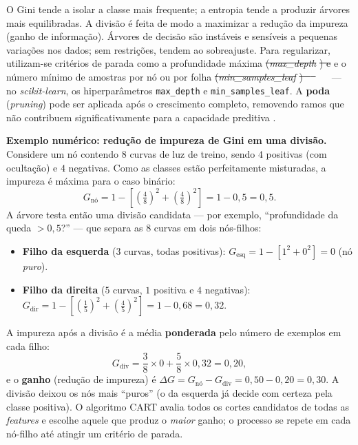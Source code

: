 \documentclass[msc]{on} %
\makeatletter
\providecommand{\DIFaddtex}[1]{{\protect\color{red}#1}} %
\providecommand{\DIFdeltex}[1]{{\protect\color{red}\sout{#1}}} %
\providecommand{\DIFaddbegin}{} %
\providecommand{\DIFaddend}{} %
\providecommand{\DIFdelbegin}{} %
\providecommand{\DIFdelend}{} %
\providecommand{\DIFadd}[1]{\texorpdfstring{\DIFaddtex{#1}}{#1}} %
\providecommand{\DIFdel}[1]{\texorpdfstring{\DIFdeltex{#1}}{}} %
\let\sout@orig\sout %
\renewcommand{\sout}[1]{\ifmmode\text{\sout@orig{\ensuremath{#1}}}\else\sout@orig{#1}\fi} %
\makeatother
\begin{document}
O Gini tende a isolar a classe mais frequente; a entropia tende a produzir árvores mais equilibradas. A divisão é feita de modo a maximizar a redução da impureza (ganho de informação). Árvores de decisão são instáveis e sensíveis a pequenas variações nos dados; sem restrições, tendem ao sobreajuste. Para regularizar, utilizam-se critérios de parada como \DIFaddbegin \DIFadd{a }\DIFaddend profundidade máxima \DIFdelbegin \DIFdel{(}\textit{\DIFdel{max\_depth}}%
\DIFdel{) e }\DIFdelend \DIFaddbegin \DIFadd{e o }\DIFaddend número mínimo de amostras por nó ou por folha \DIFdelbegin \DIFdel{(}\textit{\DIFdel{min\_samples\_leaf}}%
\DIFdel{) \mbox{%
\citep{geron2019maos} }\hskip0pt%
}\DIFdelend \DIFaddbegin \DIFadd{\mbox{%
\citep{geron2019maos} }\hskip0pt%
--- no }\textit{\DIFadd{scikit-learn}}\DIFadd{, os hiperparâmetros }\texttt{\DIFadd{max\_depth}} \DIFadd{e }\texttt{\DIFadd{min\_samples\_leaf}}\DIFaddend . A \textbf{poda} (\textit{pruning}) pode ser aplicada após o crescimento completo, removendo ramos que não contribuem significativamente para a capacidade preditiva \citep{Levada2026}.

\vspace{0.3cm}
\noindent\textbf{Exemplo numérico: redução de impureza de Gini em uma divisão.}
Considere um nó contendo $8$ curvas de luz de treino, sendo $4$ positivas (com ocultação) e $4$ negativas. Como as classes estão perfeitamente misturadas, a impureza é máxima para o caso binário:
\[
G_{\text{nó}} = 1 - \left[\left(\tfrac{4}{8}\right)^2 + \left(\tfrac{4}{8}\right)^2\right] = 1 - 0{,}5 = 0{,}5.
\]
A árvore testa então uma divisão candidata --- por exemplo, ``profundidade da queda $> 0{,}5$?'' --- que separa as $8$ curvas em dois nós-filhos:
\begin{itemize}
	\item \textbf{Filho da esquerda} ($3$ curvas, todas positivas): $G_{\text{esq}} = 1 - \left[1^2 + 0^2\right] = 0$ (nó \emph{puro}).
	\item \textbf{Filho da direita} ($5$ curvas, $1$ positiva e $4$ negativas): $G_{\text{dir}} = 1 - \left[\left(\tfrac{1}{5}\right)^2 + \left(\tfrac{4}{5}\right)^2\right] = 1 - 0{,}68 = 0{,}32$.
\end{itemize}
A impureza após a divisão é a média \textbf{ponderada} pelo número de exemplos em cada filho:
\[
G_{\text{div}} = \frac{3}{8}\times 0 + \frac{5}{8}\times 0{,}32 = 0{,}20,
\]
e o \textbf{ganho} (redução de impureza) é $\Delta G = G_{\text{nó}} - G_{\text{div}} = 0{,}50 - 0{,}20 = 0{,}30$. A divisão deixou os nós mais ``puros'' (o da esquerda já decide com certeza pela classe positiva). O algoritmo CART avalia todos os cortes candidatos de todas as \textit{features} e escolhe aquele que produz o \emph{maior} ganho; o processo se repete em cada nó-filho até atingir um critério de parada.
\vspace{0.3cm}
\end{document}

